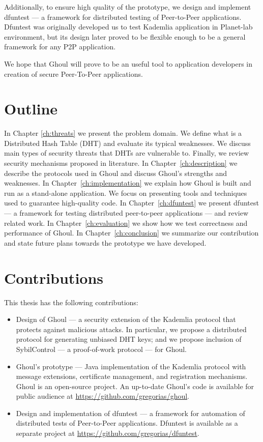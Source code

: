 Additionally, to ensure high quality of the prototype, we design and implement
dfuntest --- a framework for distributed testing of Peer-to-Peer applications.
Dfuntest was originally developed us to test Kademlia application in Planet-lab
environment, but its design later proved to be flexible enough to be a general
framework for any P2P application.

We hope that Ghoul will prove to be an useful tool to application developers in
creation of secure Peer-To-Peer applications.

\section{Outline}
In Chapter \ref{ch:threats} we present the problem domain.
We define what is a Distributed Hash Table (DHT) and evaluate its typical
weaknesses.
We discuss main types of security threats that DHTs are vulnerable to.
Finally, we review security mechanisms proposed in literature.
In Chapter~\ref{ch:description} we describe the protocols used in Ghoul and
discuss Ghoul's strengths and weaknesses.
In Chapter~\ref{ch:implementation} we explain how Ghoul is built and run as a
stand-alone application.
We focus on presenting tools and techniques used to guarantee high-quality code.
In Chapter~\ref{ch:dfuntest} we present dfuntest --- a framework for testing
distributed peer-to-peer applications --- and review related work.
In Chapter~\ref{ch:evaluation} we show how we test correctness and
performance of Ghoul.
In Chapter~\ref{ch:conclusion} we summarize our contribution and state future
plans towards the prototype we have developed.

\section{Contributions}
This thesis has the following contributions:
\begin{itemize}
  \item Design of Ghoul --- a security extension of the Kademlia protocol that
    protects against malicious attacks.
    In particular, we propose a distributed protocol for generating unbiased DHT
    keys; and we propose inclusion of SybilControl --- a proof-of-work protocol
    --- for Ghoul.
  \item Ghoul's prototype --- Java implementation of the Kademlia protocol with
    message extensions, certificate management, and registration mechanisms.
    Ghoul is an open-source project.
    An up-to-date Ghoul's code is available for public audience at \url{https://github.com/gregorias/ghoul}.
  \item Design and implementation of dfuntest --- a framework for automation of
    distributed tests of Peer-to-Peer applications.
    Dfuntest is available as a separate project at
    \url{https://github.com/gregorias/dfuntest}.
\end{itemize}

